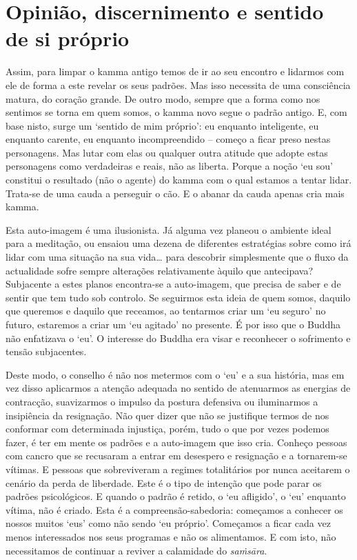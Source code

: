 \section{Opinião, discernimento e sentido de si próprio}

Assim, para limpar o kamma antigo temos de ir ao seu encontro e lidarmos com ele
de forma a este revelar os seus padrões. Mas isso necessita de uma consciência
matura, do coração grande. De outro modo, sempre que a forma como nos sentimos
se torna em quem somos, o kamma novo segue o padrão antigo. E, com base nisto,
surge um `sentido de mim próprio': eu enquanto inteligente, eu enquanto carente,
eu enquanto incompreendido -- começo a ficar preso nestas personagens. Mas lutar
com elas ou qualquer outra atitude que adopte estas personagens como verdadeiras
e reais, não as liberta. Porque a noção `eu sou' constitui o resultado (não o
agente) do kamma com o qual estamos a tentar lidar. Trata-se de uma cauda a
perseguir o cão. E o abanar da cauda apenas cria mais kamma.

Esta auto-imagem é uma ilusionista. Já alguma vez planeou o ambiente ideal para
a meditação, ou ensaiou uma dezena de diferentes estratégias sobre como irá
lidar com uma situação na sua vida\ldots{} para descobrir simplesmente que o fluxo da
actualidade sofre sempre alterações relativamente àquilo que antecipava?
Subjacente a estes planos encontra-se a auto-imagem, que precisa de saber e de
sentir que tem tudo sob controlo. Se seguirmos esta ideia de quem somos, daquilo
que queremos e daquilo que receamos, ao tentarmos criar um `eu seguro' no
futuro, estaremos a criar um `eu agitado' no presente. É por isso que o Buddha
não enfatizava o `eu'. O interesse do Buddha era visar e reconhecer o sofrimento
e tensão subjacentes.

Deste modo, o conselho é não nos metermos com o `eu' e a sua história, mas em
vez disso aplicarmos a atenção adequada no sentido de atenuarmos as energias de
contracção, suavizarmos o impulso da postura defensiva ou iluminarmos a
insipiência da resignação. Não quer dizer que não se justifique termos de nos
conformar com determinada injustiça, porém, tudo o que por vezes podemos fazer,
é ter em mente os padrões e a auto-imagem que isso cria. Conheço pessoas com
cancro que se recusaram a entrar em desespero e resignação e a tornarem-se
vítimas. E pessoas que sobreviveram a regimes totalitários por nunca aceitarem o
cenário da perda de liberdade. Este é o tipo de intenção que pode parar os
padrões psicológicos. E quando o padrão é retido, o `eu afligido', o `eu'
enquanto vítima, não é criado. Esta é a compreensão-sabedoria: começamos a
conhecer os nossos muitos `eus' como não sendo `eu próprio'. Começamos a ficar
cada vez menos interessados nos seus programas e não os alimentamos. E com isto,
não necessitamos de continuar a reviver a calamidade do \emph{saṁsāra}.

